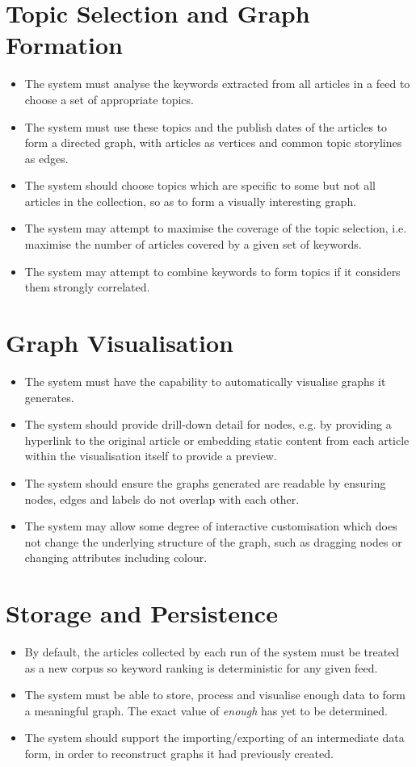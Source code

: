 \section{Topic Selection and Graph Formation}
\begin{itemize}
	\item The system must analyse the keywords extracted from all articles in a feed to choose a set of appropriate topics.
	\item The system must use these topics and the publish dates of the articles to form a directed graph, with articles as vertices and common topic storylines as edges.
	\item The system should choose topics which are specific to some but not all articles in the collection, so as to form a visually interesting graph.
	\item The system may attempt to maximise the coverage of the topic selection, i.e. maximise the number of articles covered by a given set of keywords.
	 \item The system may attempt to combine keywords to form topics if it considers them strongly correlated.
\end{itemize}
\section{Graph Visualisation}
\begin{itemize}
	\item The system must have the capability to automatically visualise graphs it generates.
	\item The system should provide drill-down detail for nodes, e.g. by providing a hyperlink to the original article or embedding static content from each article within the visualisation itself to provide a preview.
	\item The system should ensure the graphs generated are readable by ensuring nodes, edges and labels do not overlap with each other.
	\item The system may allow some degree of interactive customisation which does not change the underlying structure of the graph, such as dragging nodes or changing attributes including colour.
\end{itemize}
\section{Storage and Persistence}
\begin{itemize}
	\item By default, the articles collected by each run of the system must be treated as a new corpus so keyword ranking is deterministic for any given feed.
	\item The system must be able to store, process and visualise enough data to form a meaningful graph. The exact value of \textit{enough} has yet to be determined.
	\item The system should support the importing/exporting of an intermediate data form, in order to reconstruct graphs it had previously created.
\end{itemize}
